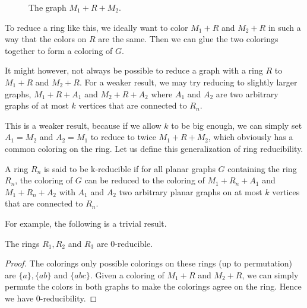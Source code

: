 \begin{figure}[!ht]
    \centering
    \caption{The graph $M_1 + R + M_2$.}
\end{figure}

To reduce a ring like this, we ideally want to color $M_1+R$ and $M_2+R$ in such a way that the colors on $R$ are the same. Then we can glue the two colorings together to form a coloring of $G$.

It might however, not always be possible to reduce a graph with a ring $R$ to $M_1+R$ and $M_2+R$. For a weaker result, we may try reducing to slightly larger graphs, $M_1+R+A_1$ and $M_2+R+A_2$ where $A_1$ and $A_2$ are two arbitrary graphs of at most $k$ vertices that are connected to $R_n$.

This is a weaker result, because if we allow $k$ to be big enough, we can simply set $A_1 = M_2$ and $A_2 = M_1$ to reduce to twice $M_1 + R + M_2$, which obviously has a common coloring on the ring. Let us define this generalization of ring reducibility.

\begin{definition}
    A ring $R_n$ is said to be k-reducible if for all planar graphs $G$ containing the ring $R_n$, the coloring of $G$ can be reduced to the coloring of $M_1+R_n+A_1$ and $M_1+R_n+A_2$ with $A_1$ and $A_2$ two arbitrary planar graphs on at most $k$ vertices that are connected to $R_n$.
\end{definition}

For example, the following is a trivial result.

\begin{example}
    The rings $R_1, R_2$ and $R_3$ are 0-reducible.
\end{example}

\begin{proof}
    The colorings only possible colorings on these rings (up to permutation) are $\{ a \}, \{ ab \}$ and $\{ abc \}$. Given a coloring of $M_1+R$ and $M_2+R$, we can simply permute the colors in both graphs to make the colorings agree on the ring. Hence we have 0-reducibility.
\end{proof}

